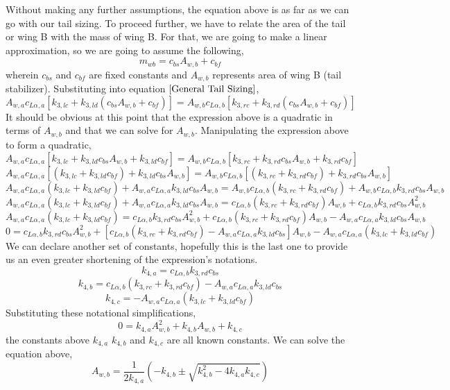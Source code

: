 Without making any further assumptions, the equation above is as far as we can go with our tail sizing. To proceed further, we have to relate the area of the tail or wing B with the mass of wing B. For that, we are going to make a linear approximation, so we are going to assume the following,
$$m_{wb} = c_{bs}A_{w,b} + c_{bf}$$
wherein $c_{bs}$ and $c_{bf}$ are fixed constants and $A_{w,b}$ represents area of wing B (tail stabilizer). Substituting into equation $\ref{General Tail Sizing}$,
$$A_{w,a} c_{L\alpha,a} \left[k_{3,lc} + k_{3,ld} (c_{bs}A_{w,b} + c_{bf}) \right] = A_{w,b} c_{L\alpha,b}\left[k_{3,rc} + k_{3,rd} (c_{bs}A_{w,b} + c_{bf})\right] $$
It should be obvious at this point that the expression above is a quadratic in terms of $A_{w,b}$ and that we can solve for $A_{w,b}$. Manipulating the expression above to form a quadratic,
$$A_{w,a} c_{L\alpha,a} \left[k_{3,lc} + k_{3,ld}c_{bs}A_{w,b} + k_{3,ld}c_{bf} \right] = A_{w,b} c_{L\alpha,b}\left[k_{3,rc} + k_{3,rd}c_{bs}A_{w,b} + k_{3,rd}c_{bf}\right] $$
$$A_{w,a} c_{L\alpha,a} \left[(k_{3,lc} + k_{3,ld}c_{bf}) + k_{3,ld}c_{bs}A_{w,b} \right] = A_{w,b} c_{L\alpha,b}\left[(k_{3,rc} + k_{3,rd}c_{bf}) + k_{3,rd}c_{bs}A_{w,b}\right] $$
$$A_{w,a} c_{L\alpha,a}(k_{3,lc} + k_{3,ld}c_{bf}) + A_{w,a} c_{L\alpha,a}k_{3,ld}c_{bs}A_{w,b}   =  A_{w,b} c_{L\alpha,b}(k_{3,rc} + k_{3,rd}c_{bf}) + A_{w,b} c_{L\alpha,b}k_{3,rd}c_{bs}A_{w,b}  $$
$$A_{w,a}c_{L\alpha,a}(k_{3,lc}+k_{3,ld}c_{bf}) + A_{w,a}c_{L\alpha,a}k_{3,ld}c_{bs}A_{w,b} = c_{L\alpha,b}(k_{3,rc}+k_{3,rd}c_{bf})A_{w,b} + c_{L\alpha,b}k_{3,rd}c_{bs}A_{w,b}^{2}$$
$$A_{w,a}c_{L\alpha,a}(k_{3,lc}+k_{3,ld}c_{bf}) = c_{L\alpha,b}k_{3,rd}c_{bs}A_{w,b}^{2} + c_{L\alpha,b}(k_{3,rc}+k_{3,rd}c_{bf})A_{w,b} - A_{w,a}c_{L\alpha,a}k_{3,ld}c_{bs}A_{w,b}$$
$$0 = c_{L\alpha,b}k_{3,rd}c_{bs}A_{w,b}^{2} + [c_{L\alpha,b}(k_{3,rc}+k_{3,rd}c_{bf})-A_{w,a}c_{L\alpha,a}k_{3,ld}c_{bs}]A_{w,b} - A_{w,a}c_{L\alpha,a}(k_{3,lc}+k_{3,ld}c_{bf})$$
We can declare another set of constants, hopefully this is the last one to provide us an even greater shortening of the expression's notations.
\begin{equation}k_{4,a} = c_{L\alpha,b}k_{3,rd}c_{bs} \label{k4 definitions coeff a}\end{equation}
\begin{equation}k_{4,b} = c_{L\alpha,b}(k_{3,rc}+k_{3,rd}c_{bf})-A_{w,a}c_{L\alpha,a}k_{3,ld}c_{bs} \label{k4 definitions coeff b}\end{equation}
\begin{equation}k_{4,c} =  - A_{w,a}c_{L\alpha,a}(k_{3,lc}+k_{3,ld}c_{bf}) \label{k4 definitions coeff c}\end{equation}
Substituting these notational simplifications,
$$0 = k_{4,a}A_{w,b}^{2} + k_{4,b}A_{w,b} + k_{4,c}$$
the constants above $k_{4,a}$ $k_{4,b}$ and $k_{4,c}$ are all known constants. We can solve the equation above,
$$A_{w,b} = \frac{1}{2k_{4,a}}\left(-k_{4,b} \pm \sqrt{k_{4,b}^{2}-4k_{4,a}k_{4,c}}\right)$$

